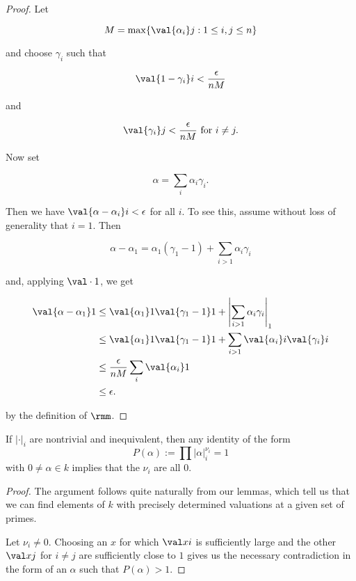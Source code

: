 \begin{proof}
  Let

  \[ M = \max \{ \val {\alpha_i} j : 1\leq i, j\leq n \} \]

  and choose $\gamma_i$ such that

  \[ \val {1-\gamma_i} i < \frac\epsilon {nM}\]

  and

  \[\val {\gamma_i} j < \frac\epsilon{nM} \text { for } i\neq j. \]

  Now set

  \[ \alpha = \sum_i \alpha_i\gamma_i. \]

  Then we have $\val {\alpha-\alpha_i} i < \epsilon$ for all $i$. To see this,
  assume without loss of generality that $i = 1$. Then

  \[ \alpha - \alpha_1 = \alpha_1(\gamma_1 - 1) + \sum_{i>1}\alpha_i\gamma_i \]

  and, applying $\val \cdot 1$, we get

  \begin{align*}
    \val {\alpha-\alpha_1} 1 &\leq \val {\alpha_1} 1\val {\gamma_1 - 1} 1 + \left|{\sum_{i>1}\alpha_i\gamma_i}\right|_1\\
                             &\leq \val {\alpha_1} 1\val {\gamma_1 - 1} 1 + \sum_{i>1}\val {\alpha_i} i\val{\gamma_i}i \\
                             &\leq \frac \epsilon {nM} \sum_i \val {\alpha_i} 1 \\
                             &\leq \epsilon.
  \end{align*}

  by the definition of $\rmm$.
\end{proof}

\begin{cor}
  \label{eq:corollary}
  If $|\cdot|_i$ are nontrivial and inequivalent, then any identity of the
  form \[ P(\alpha) := \prod |\alpha|_{i}^{\nu_i} = 1\] with $0\neq \alpha\in k$ implies
  that the $\nu_i$ are all $0$.
\end{cor}

\begin{proof}
  The argument follows quite naturally from our lemmas, which tell us that we can
  find elements of $k$ with precisely determined valuations at a given set of
  primes.

  Let $\nu_i\neq 0$. Choosing an $x$ for which $\val x i$ is sufficiently large
  and the other $\val x j$ for $i\neq j$ are sufficiently close to $1$ gives us
  the necessary contradiction in the form of an $\alpha$ such that $P(\alpha) >
  1$.
\end{proof}

